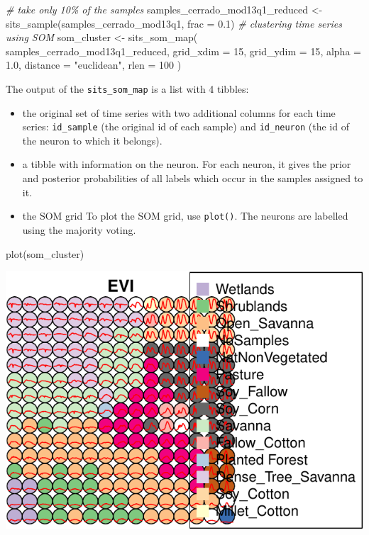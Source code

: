 \documentclass[a4paper,]{tufte-book}
\newenvironment{Shaded}{}{}
\newcommand{\AttributeTok}[1]{\textcolor[rgb]{0.49,0.56,0.16}{#1}}
\newcommand{\CommentTok}[1]{\textcolor[rgb]{0.38,0.63,0.69}{\textit{#1}}}
\newcommand{\DecValTok}[1]{\textcolor[rgb]{0.25,0.63,0.44}{#1}}
\newcommand{\FloatTok}[1]{\textcolor[rgb]{0.25,0.63,0.44}{#1}}
\newcommand{\FunctionTok}[1]{\textcolor[rgb]{0.02,0.16,0.49}{#1}}
\newcommand{\NormalTok}[1]{#1}
\newcommand{\OtherTok}[1]{\textcolor[rgb]{0.00,0.44,0.13}{#1}}
\newcommand{\StringTok}[1]{\textcolor[rgb]{0.25,0.44,0.63}{#1}}
\begin{document}
\begin{Shaded}
\begin{Highlighting}[]
\CommentTok{\# take only 10\% of the samples}
\NormalTok{samples\_cerrado\_mod13q1\_reduced }\OtherTok{\textless{}{-}} \FunctionTok{sits\_sample}\NormalTok{(samples\_cerrado\_mod13q1, }\AttributeTok{frac =} \FloatTok{0.1}\NormalTok{)}
\CommentTok{\# clustering time series using SOM}
\NormalTok{som\_cluster }\OtherTok{\textless{}{-}}
    \FunctionTok{sits\_som\_map}\NormalTok{(}
\NormalTok{        samples\_cerrado\_mod13q1\_reduced,}
        \AttributeTok{grid\_xdim =} \DecValTok{15}\NormalTok{,}
        \AttributeTok{grid\_ydim =} \DecValTok{15}\NormalTok{,}
        \AttributeTok{alpha =} \FloatTok{1.0}\NormalTok{,}
        \AttributeTok{distance =} \StringTok{"euclidean"}\NormalTok{,}
        \AttributeTok{rlen =} \DecValTok{100}
\NormalTok{    )}
\end{Highlighting}
\end{Shaded}

The output of the \texttt{sits\_som\_map} is a list with 4 tibbles:

\begin{itemize}
\item
  the original set of time series with two additional columns for each time series: \texttt{id\_sample} (the original id of each sample) and \texttt{id\_neuron} (the id of the neuron to which it belongs).
\item
  a tibble with information on the neuron. For each neuron, it gives the prior and posterior probabilities of all labels which occur in the samples assigned to it.
\item
  the SOM grid
  To plot the SOM grid, use \texttt{plot()}. The neurons are labelled using the majority voting.
\end{itemize}

\begin{Shaded}
\begin{Highlighting}[]
\FunctionTok{plot}\NormalTok{(som\_cluster)}
\end{Highlighting}
\end{Shaded}

\begin{center}\includegraphics[width=0.7\linewidth]{sitsbook_files/figure-latex/unnamed-chunk-39-1} \end{center}
\end{document}
